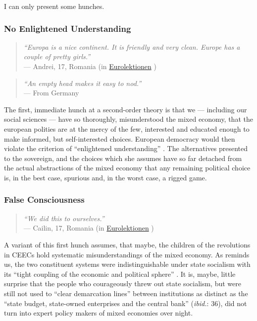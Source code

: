 \documentclass[11pt,a4paper,oneside]{article}
\begin{document}
I can only present some hunches.

\subsubsection[No Enlightened Understanding]{No Enlightened Understanding}

\begin{quote}
	\emph{``Europa is a nice continent.
	It is friendly and very clean.
	Europe has a couple of pretty girls.''}\\
	--- Andrei, 17, Romania (in \href{http://eurolektionen.de}{Eurolektionen} \citeyear{DeRuffray2010})
\end{quote}

\begin{quote}
	\emph{``An empty head makes it easy to nod.''}\\
	--- From Germany
\end{quote}

The first, immediate hunch at a second-order theory is that we --- including our social sciences --- have so thoroughly, misunderstood the mixed economy, that the european polities are at the mercy of the few, interested and educated enough to make informed, but self-interested choices.
European democracy would then violate the criterion of ``enlightened understanding'' \citep{Dahl-1989-aa}.
The alternatives presented to the sovereign, and the choices which she assumes have so far detached from the actual abstractions of the mixed economy that any remaining political choice is, in the best case, spurious and, in the worst case, a rigged game.

\subsubsection[False Consciousness]{False Consciousness}

\begin{quote}
	\emph{``We did this to ourselves.''}\\
	--- Cailin, 17, Romania (in \href{http://eurolektionen.de}{Eurolektionen} \citeyear{DeRuffray2010})
\end{quote}

A variant of this first hunch assumes, that maybe, the children of the revolutions in \glspl{CEEC} hold systematic misunderstandings of the mixed economy.
As \citeauthor{Bonker2006} reminds us, the two constituent systems were indistinguishable under state socialism with its ``tight coupling of the economic and political sphere'' \citeyearpar[35]{Bonker2006}.
It is, maybe, little surprise that the people who courageously threw out state socialism, but were still not used to ``clear demarcation lines'' between institutions as distinct as the ``state budget, state-owned enterprises and the central bank'' (\emph{ibid.}: 36), did not turn into expert policy makers of mixed economies over night.
\end{document}
